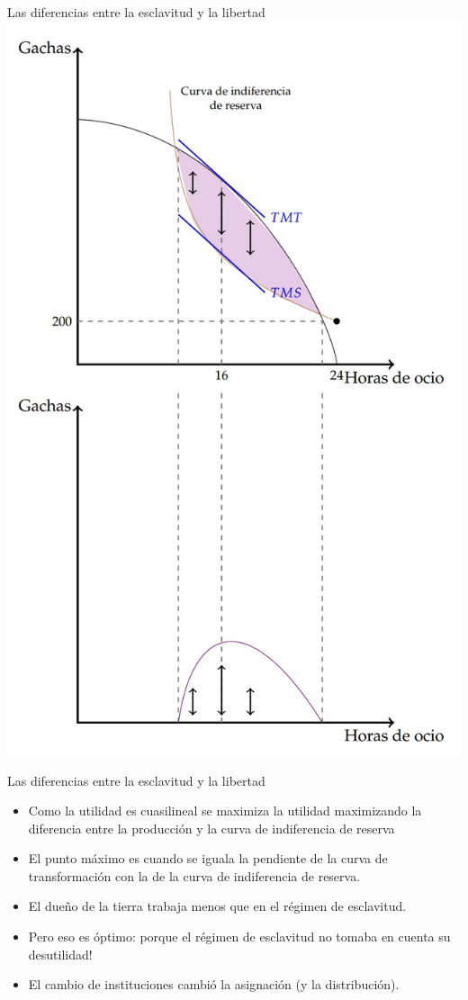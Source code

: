 \documentclass{beamer}
\begin{document}
\begin{frame}{Las diferencias entre la esclavitud y la libertad}
\centering
\includegraphics[scale=0.55]{../Figures/Instituciones2.jpg}
\end{frame}


\begin{frame}{Las diferencias entre la esclavitud y la libertad}
\begin{itemize}
    \item Como la utilidad es cuasilineal se maximiza la utilidad maximizando la diferencia entre la producción y la curva de indiferencia de reserva
     \item El punto máximo es cuando se iguala la pendiente de la curva de transformación con la de la curva de indiferencia de reserva. 
    \item El dueño de la tierra trabaja menos que en el régimen de esclavitud.\vspace{4mm}
    \item Pero eso es óptimo: porque el régimen de esclavitud no tomaba en cuenta su desutilidad! \vspace{4mm}
    \item  El cambio de instituciones cambió la asignación (y la distribución).
\end{itemize}
\end{frame}
\end{document}
